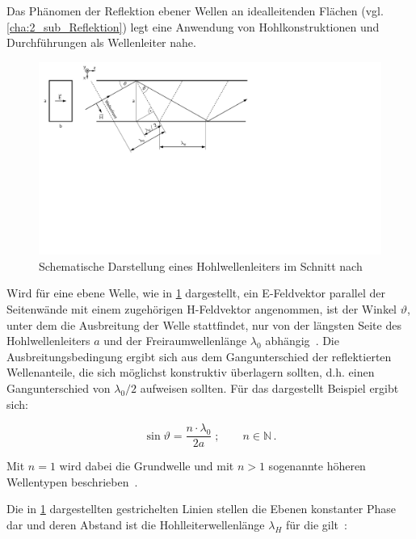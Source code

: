 Das Phänomen der Reflektion ebener Wellen an idealleitenden Flächen (vgl. \Abschnitt\ref{cha:2_sub_Reflektion}) legt eine Anwendung von Hohlkonstruktionen und Durchführungen als Wellenleiter nahe. 
\par
\vspace{\linespace}
\begin{figure}
    \centering
    \includegraphics[scale = 1, trim = 0cm 10cm 13cm 0cm, clip, width=.8\textwidth]{Abbildungen/Kapitel2/Hohlwellenleiter.pdf}
    \caption[Schematische Darstellung eines Hohlwellenleiters im Schnitt]{Schematische Darstellung eines Hohlwellenleiters im Schnitt nach~\cite{Taschenbuch_HF-Technik}}
    \label{fig:2_Hohlwellenleiter}
\end{figure}

Wird für eine ebene Welle, wie in \Abb\ref{fig:2_Hohlwellenleiter} dargestellt, ein E-Feldvektor parallel der Seitenwände mit einem zugehörigen H-Feldvektor angenommen, ist der Winkel $\vartheta$, unter dem die Ausbreitung der Welle stattfindet, nur von der längsten Seite des Hohlwellenleiters $a$ und der Freiraumwellenlänge $\lambda_0$ abhängig~\cite{Taschenbuch_HF-Technik}. Die Ausbreitungsbedingung ergibt sich aus dem Gangunterschied der reflektierten Wellenanteile, die sich möglichst konstruktiv überlagern sollten, d.h. einen Gangunterschied von $\lambda_0 / 2$ aufweisen sollten. Für das dargestellt Beispiel ergibt sich: 

\begin{equation}
    \sin{\vartheta} = \frac{n \cdot \lambda_0}{2 a} \; ; \qquad n \in \mathbb{N} \, \text{.}
\end{equation}
 
Mit $n=1$ wird dabei die Grundwelle und mit $n>1$ sogenannte höheren Wellen\-typen beschrieben~\cite{Taschenbuch_HF-Technik}.
\par
\vspace{\linespace}
Die in  \Abb\ref{fig:2_Hohlwellenleiter} dargestellten gestrichelten Linien stellen die Ebenen konstanter Phase dar und deren Abstand ist die Hohlleiterwellenlänge $\lambda_H$ für die gilt~\cite{Taschenbuch_HF-Technik}:

